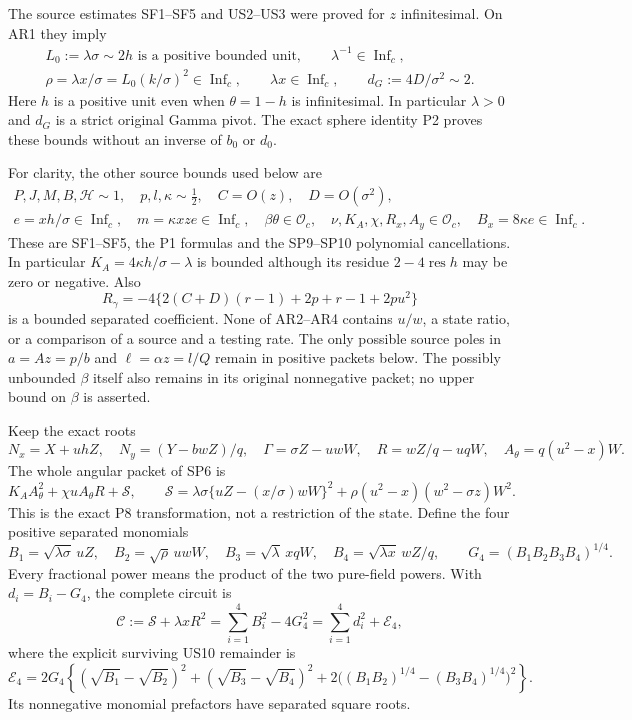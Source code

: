 The source estimates SF1--SF5 and US2--US3 were proved for
$z$ infinitesimal. On AR1 they imply
\[
 \begin{gathered}
 L_0:=\lambda\sigma\sim2h\text{ is a positive bounded unit},
 \qquad \lambda^{-1}\in\operatorname{Inf}_c,\\
 \rho=\lambda x/\sigma=L_0(k/\sigma)^2\in\operatorname{Inf}_c,
 \qquad \lambda x\in\operatorname{Inf}_c,
 \qquad d_G:=4D/\sigma^2\sim2. 
 \end{gathered} \tag{AR2}
\]
Here $h$ is a positive unit even when $\theta=1-h$ is
infinitesimal. In particular $\lambda>0$ and $d_G$ is a strict
original Gamma pivot. The exact sphere identity P2 proves these
bounds without an inverse of $b_0$ or $d_0$.

For clarity, the other source bounds used below are
\[
 \begin{gathered}
 P,J,M,B,\mathcal H\sim1,\quad p,l,\kappa\sim\tfrac12,
 \quad C=O(z),\quad D=O(\sigma^2),\\
 e=xh/\sigma\in\operatorname{Inf}_c,\quad
 m=\kappa xze\in\operatorname{Inf}_c,\quad
 \beta\theta\in\mathcal O_c,\quad
 \nu,K_A,\chi,R_x,A_y\in\mathcal O_c,
 \quad B_x=8\kappa e\in\operatorname{Inf}_c.
 \end{gathered} \tag{AR3}
\]
These are SF1--SF5, the P1 formulas and the SP9--SP10 polynomial
cancellations. In particular $K_A=4\kappa h/\sigma-\lambda$
is bounded although its residue $2-4\operatorname{res}h$ may be
zero or negative. Also
\[
 R_\gamma=-4\{2(C+D)(r-1)+2p+r-1+2pu^2\}
 \tag{AR4}
\]
is a bounded separated coefficient. None of AR2--AR4 contains
$u/w$, a state ratio, or a comparison of a source and a testing
rate. The only possible source poles in $a=Az=p/b$ and
$\ell=\alpha z=l/Q$ remain in positive packets below. The
possibly unbounded $\beta$ itself also remains in its original
nonnegative packet; no upper bound on $\beta$ is asserted.

Keep the exact roots
\[
 N_x=X+uhZ,\quad N_y=(Y-bwZ)/q,\quad
 \Gamma=\sigma Z-uwW,\quad R=wZ/q-uqW,
 \quad A_\theta=q(u^2-x)W.
 \tag{AR5}
\]
The whole angular packet of SP6 is
\[
 K_AA_\theta^2+\chi uA_\theta R+\mathscr S,
 \qquad
 \mathscr S=\lambda\sigma\{uZ-(x/\sigma)wW\}^2
       +\rho(u^2-x)(w^2-\sigma z)W^2.
 \tag{AR6}
\]
This is the exact P8 transformation, not a restriction of the state.
Define the four positive separated monomials
\[
 B_1=\sqrt{\lambda\sigma}\,uZ,\quad
 B_2=\sqrt\rho\,uwW,\quad
 B_3=\sqrt\lambda\,xqW,\quad
 B_4=\sqrt{\lambda x}\,wZ/q,
 \qquad G_4=(B_1B_2B_3B_4)^{1/4}.
 \tag{AR7}
\]
Every fractional power means the product of the two pure-field
powers. With $d_i=B_i-G_4$, the complete circuit is
\[
 \mathscr C:=\mathscr S+\lambda xR^2
       =\sum_{i=1}^4B_i^2-4G_4^2
       =\sum_{i=1}^4d_i^2+\mathcal E_4,
 \tag{AR8}
\]
where the explicit surviving US10 remainder is
\[
 \mathcal E_4=2G_4\left\{
 (\sqrt{B_1}-\sqrt{B_2})^2+
 (\sqrt{B_3}-\sqrt{B_4})^2+
 2\big((B_1B_2)^{1/4}-(B_3B_4)^{1/4}\big)^2\right\}.
 \tag{AR9}
\]
Its nonnegative monomial prefactors have separated square roots.

